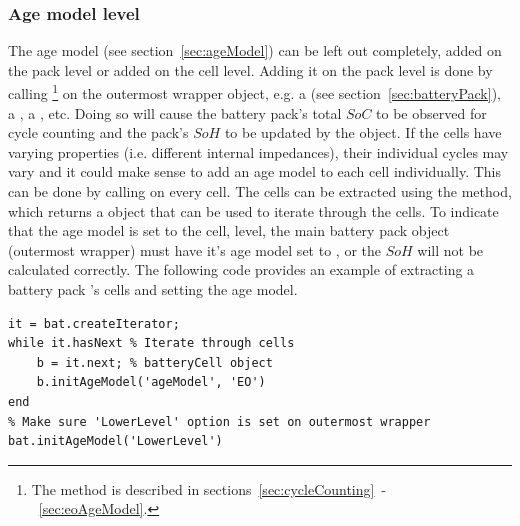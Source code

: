 \subsubsection{Age model level}
\label{sec:AgeModelLevel}
The age model (see section~\ref{sec:ageModel}) can be left out completely, added on the pack level or added on the cell level. Adding it on the pack level is done by calling \footnote{The  method is described in sections~\ref{sec:cycleCounting}~-~\ref{sec:eoAgeModel}.} on the outermost wrapper object, e.g. a  (see section~\ref{sec:batteryPack}), a , a , etc. Doing so will cause the battery pack's total $SoC$ to be observed for cycle counting and the pack's $SoH$ to be updated by the  object. If the cells have varying properties (i.e. different internal impedances), their individual cycles may vary and it could make sense to add an age model to each cell individually. This can be done by calling  on every cell. The cells can be extracted using the  method, which returns a  object that can be used to iterate through the cells. To indicate that the age model is set to the cell, level, the main battery pack object (outermost wrapper) must have it's age model set to , or the $SoH$ will not be calculated correctly. The following code provides an example of extracting a battery pack 's cells and setting the age model.
\begin{lstlisting}
it = bat.createIterator;
while it.hasNext % Iterate through cells
	b = it.next; % batteryCell object
	b.initAgeModel('ageModel', 'EO')
end
% Make sure 'LowerLevel' option is set on outermost wrapper
bat.initAgeModel('LowerLevel')
\end{lstlisting}

